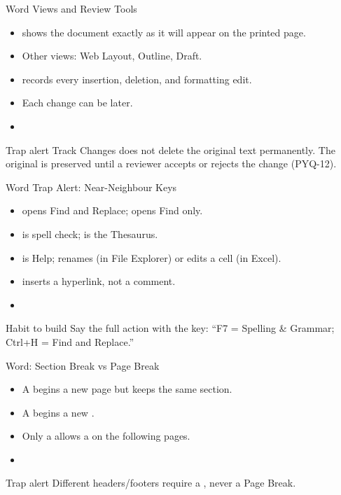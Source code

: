 \documentclass[aspectratio=169]{beamer}
\begin{document}
\begin{frame}{Word Views and Review Tools}
  \begin{itemize}
    \item {} shows the document exactly as it will appear on
      the printed page.
    \item Other views: Web Layout, Outline, Draft.
    \item {} records every insertion, deletion, and
      formatting edit.
    \item Each change can be  later.
    \item {}
  \end{itemize}
  \begin{alertblock}{Trap alert}
    Track Changes does not delete the original text permanently. The original
    is preserved until a reviewer accepts or rejects the change (PYQ-12).
  \end{alertblock}
\end{frame}

\begin{frame}{Word Trap Alert: Near-Neighbour Keys}
  \begin{itemize}
    \item {} opens Find and Replace;  opens Find only.
    \item {} is spell check;  is the Thesaurus.
    \item {} is Help;  renames (in File Explorer) or edits a
      cell (in Excel).
    \item {} inserts a hyperlink, not a comment.
    \item {}
  \end{itemize}
  \begin{block}{Habit to build}
    Say the full action with the key: ``F7 = Spelling \& Grammar; Ctrl+H =
    Find and Replace.''
  \end{block}
\end{frame}

\begin{frame}{Word: Section Break vs Page Break}
  \begin{itemize}
    \item A  begins a new page but keeps the same section.
    \item A  begins a new .
    \item Only a  allows a  on the following pages.
    \item {}
  \end{itemize}
  \begin{alertblock}{Trap alert}
    Different headers/footers require a , never a Page
    Break.
  \end{alertblock}
\end{frame}
\end{document}
